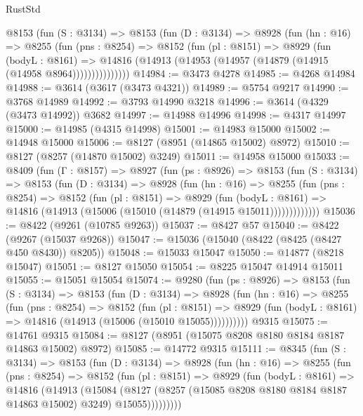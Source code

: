 \begin{lexlean}{RustStd}
\begin{coremodule}
        @8153
          (fun (S : @3134) =>
          @8153
            (fun (D : @3134) =>
            @8928
              (fun (hn : @16) =>
              @8255
                (fun (pns : @8254) =>
                @8152
                  (fun (pl : @8151) =>
                  @8929
                    (fun (bodyL : @8161) =>
                    @14816 (@14913 (@14953 (@14957 (@14879 (@14915 (@14958 @8964)))))))))))))))
@14984 := @3473 @4278
@14985 := @4268 @14984
@14988 := @3614 (@3617 (@3473 @4321))
@14989 := @5754 @9217
@14990 := @3768 @14989
@14992 := @3793 @14990 @3218
@14996 := @3614 (@4329 (@3473 @14992)) @3682
@14997 := @14988 @14996
@14998 := @4317 @14997
@15000 := @14985 (@4315 @14998)
@15001 := @14983 @15000
@15002 := @14948 @15000
@15006 := @8127 (@8951 (@14865 @15002) @8972)
@15010 := @8127 (@8257 (@14870 @15002) @3249)
@15011 := @14958 @15000
@15033 := @8409
    (fun (Γ : @8157) =>
    @8927
      (fun (ps : @8926) =>
      @8153
        (fun (S : @3134) =>
        @8153
          (fun (D : @3134) =>
          @8928
            (fun (hn : @16) =>
            @8255
              (fun (pns : @8254) =>
              @8152
                (fun (pl : @8151) =>
                @8929
                  (fun (bodyL : @8161) =>
                  @14816 (@14913 (@15006 (@15010 (@14879 (@14915 @15011)))))))))))))
@15036 := @8422 (@9261 (@10785 @9263))
@15037 := @8427 @57
@15040 := @8422 (@9267 (@15037 @9268))
@15047 := @15036 (@15040 (@8422 (@8425 (@8427 @450 @8430)) @8205))
@15048 := @15033 @15047
@15050 := @14877 (@8218 @15047)
@15051 := @8127 @15050
@15054 := @8225 @15047 @14914 @15011
@15055 := @15051 @15054
@15074 := @9280
    (fun (ps : @8926) =>
    @8153
      (fun (S : @3134) =>
      @8153
        (fun (D : @3134) =>
        @8928
          (fun (hn : @16) =>
          @8255
            (fun (pns : @8254) =>
            @8152
              (fun (pl : @8151) =>
              @8929 (fun (bodyL : @8161) => @14816 (@14913 (@15006 (@15010 @15055))))))))))
    @9315
@15075 := @14761 @9315
@15084 := @8127 (@8951 (@15075 @8208 @8180 @8184 @8187 @14863 @15002) @8972)
@15085 := @14772 @9315
@15111 := @8345
    (fun (S : @3134) =>
    @8153
      (fun (D : @3134) =>
      @8928
        (fun (hn : @16) =>
        @8255
          (fun (pns : @8254) =>
          @8152
            (fun (pl : @8151) =>
            @8929
              (fun (bodyL : @8161) =>
              @14816
                (@14913
                  (@15084
                    (@8127
                      (@8257 (@15085 @8208 @8180 @8184 @8187 @14863 @15002) @3249)
                      @15055)))))))))

\end{coremodule}
\end{lexlean}
